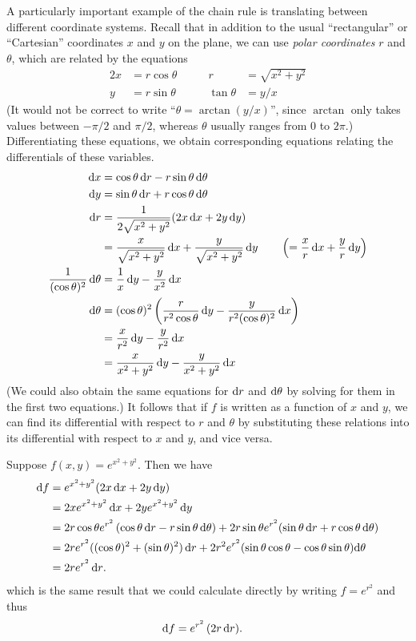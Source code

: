 \documentclass[12pt]{amsart}
\begin{document}
A particularly important example of the chain rule is translating between different coordinate systems.
Recall that in addition to the usual ``rectangular'' or ``Cartesian'' coordinates $x$ and $y$ on the plane, we can use \emph{polar coordinates} $r$ and $\theta$, which are related by the equations
\begin{alignat*}{2}
  x &= r \cos \theta &\qquad r &= \sqrt{x^2+y^2}\\
  y &= r \sin\theta &\qquad \tan \theta &= y/x
\end{alignat*}
(It would not be correct to write ``$\theta = \arctan(y/x)$'', since $\arctan$ only takes values between $-\pi/2$ and $\pi/2$, whereas $\theta$ usually ranges from $0$ to $2\pi$.)
Differentiating these equations, we obtain corresponding equations relating the differentials of these variables.
\begin{align}
  {\ensuremath{\mathrm{d} x}} &= \cos \theta \,{\mathrm{d} r} - r \sin\theta \,{\mathrm{d} \theta} \label{eq:polar-dx} \\
  {\mathrm{d} y} &= \sin\theta \,{\mathrm{d} r} + r \cos\theta\,{\mathrm{d} \theta} \label{eq:polar-dy}\\
  {\mathrm{d} r} &= \frac{1}{2\sqrt{x^2+y^2}}(2x\,{\mathrm{d} x} + 2y\,{\mathrm{d} y}) \notag\\
  &= \frac{x}{\sqrt{x^2+y^2}}\,{\mathrm{d} x} + \frac{y}{\sqrt{x^2+y^2}}\,{\mathrm{d} y}
  \qquad\left(= \frac{x}{r} \,{\mathrm{d} x} + \frac{y}{r}\,{\mathrm{d} y}\right) \notag\\
  \frac{1}{(\cos \theta)^2} \,{\mathrm{d} \theta} &= \frac{1}{x}\,{\mathrm{d} y} - \frac{y}{x^2}\,{\mathrm{d} x} \notag\\
  {\mathrm{d} \theta} &= (\cos \theta)^2 \left( \frac{r}{r^2\cos\theta}\,{\mathrm{d} y} - \frac{y}{r^2 (\cos\theta)^2}\,{\mathrm{d} x}\right) \notag\\
  &= \frac{x}{r^2} \,{\mathrm{d} y} - \frac{y}{r^2} \,{\mathrm{d} x} \notag\\
  &= \frac{x}{x^2+y^2} \,{\mathrm{d} y} - \frac{y}{x^2+y^2} \,{\mathrm{d} x} \notag
\end{align}
(We could also obtain the same equations for ${\mathrm{d} r}$ and ${\mathrm{d} \theta}$ by solving for them in the first two equations.)
It follows that if $f$ is written as a function of $x$ and $y$, we can find its differential with respect to $r$ and $\theta$ by substituting these relations into its differential with respect to $x$ and $y$, and vice versa.

\begin{eg}
  Suppose $f(x,y) = e^{x^2+y^2}$.
  Then we have
  \begin{align*}
    {\ensuremath{\mathrm{d} f}} &= e^{x^2+y^2} (2x \,{\mathrm{d} x} + 2y\,{\mathrm{d} y})\\
    &= 2x e^{x^2+y^2} \,{\mathrm{d} x} + 2y e^{x^2+y^2} \,{\mathrm{d} y}\\
    &= 2 r\cos\theta e^{r^2} \, (\cos \theta \,{\mathrm{d} r} - r \sin\theta \,{\mathrm{d} \theta}) + 2r\sin\theta e^{r^2} (\sin\theta \,{\mathrm{d} r} + r \cos\theta\,{\mathrm{d} \theta})\\
    &= 2r e^{r^2} ((\cos\theta)^2 + (\sin\theta)^2)\,{\mathrm{d} r} + 2r^2 e^{r^2}(\sin\theta\cos\theta - \cos\theta\sin\theta) {\mathrm{d} \theta}\\
    &= 2r e^{r^2}\,{\mathrm{d} r}.
  \end{align*}
  which is the same result that we could calculate directly by writing $f = e^{r^2}$ and thus
  \begin{align*}
    {\ensuremath{\mathrm{d} f}} &= e^{r^2} \, (2r\,{\mathrm{d} r}).
  \end{align*}
\end{eg}
\end{document}
